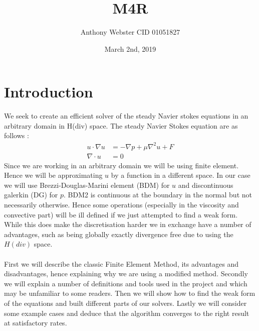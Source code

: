 \documentclass[11pt,twoside,a4paper]{article}
\begin{document}
\setcounter{secnumdepth}{0}
\title{M4R}
\date{March 2nd, 2019}
\author{Anthony Webster CID 01051827}
\maketitle
\section{Introduction}
We seek to create an efficient solver of the steady Navier stokes equations in an arbitrary domain in H(div) space. The steady Navier Stokes equation are as follows : 
\begin{align}
u \cdot \nabla u &= -\nabla p + \mu \nabla^2 u + F \\
\nabla \cdot u &= 0
\end{align}
Since we are working in an arbitrary domain we will be using finite element. Hence we will be approximating $u$ by a function in a different space. In our case we will use Brezzi-Douglas-Marini element (BDM) for $u$ and discontinuous galerkin (DG) for $p$. BDM2 is continuous at the boundary in the normal but not necessarily otherwise. Hence some operations (especially in the viscosity and convective part) will be ill defined if we just attempted to find a weak form. While this does make the discretisation harder we in exchange have a number of advantages, such as being globally exactly divergence free due to using the $H(div)$ space.\\
\\
First we will describe the classic Finite Element Method, its advantages and disadvantages, hence explaining why we are using a modified method. Secondly we will explain a number of definitions and tools used in the project and which may be unfamiliar to some readers. Then we will show how to find the weak form of the equations and built different parts of our solvers. Lastly we will consider some example cases and deduce that the algorithm converges to the right result at satisfactory rates.\\
\end{document}
